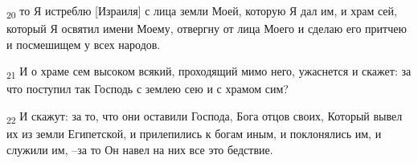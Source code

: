 \begin{tcolorbox}
\textsubscript{20} то Я истреблю [Израиля] с лица земли Моей, которую Я дал им, и храм сей, который Я освятил имени Моему, отвергну от лица Моего и сделаю его притчею и посмешищем у всех народов.
\end{tcolorbox}
\begin{tcolorbox}
\textsubscript{21} И о храме сем высоком всякий, проходящий мимо него, ужаснется и скажет: за что поступил так Господь с землею сею и с храмом сим?
\end{tcolorbox}
\begin{tcolorbox}
\textsubscript{22} И скажут: за то, что они оставили Господа, Бога отцов своих, Который вывел их из земли Египетской, и прилепились к богам иным, и поклонялись им, и служили им, --за то Он навел на них все это бедствие.
\end{tcolorbox}
